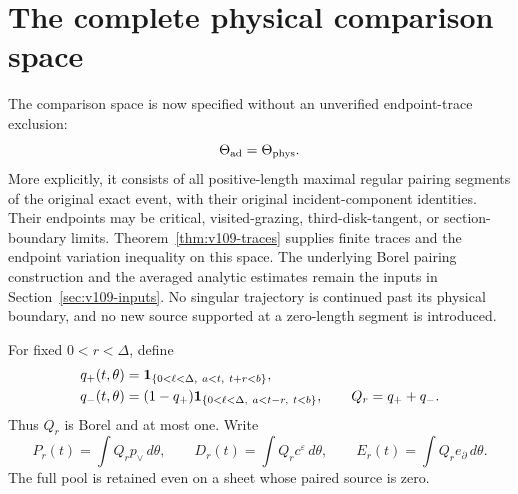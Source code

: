 \section{The complete physical comparison space}
\label{sec:v109-pool}
The comparison space is now specified without an unverified
endpoint-trace exclusion:
\begin{equation}\label{eq:v109-admissible}
 \Theta_{\rm ad}=\Theta_{\rm phys}.
\end{equation}
More explicitly, it consists of all positive-length maximal regular
pairing segments of the original exact event, with their original
incident-component identities. Their endpoints may be critical,
visited-grazing, third-disk-tangent, or section-boundary limits.
Theorem~\ref{thm:v109-traces} supplies finite traces and the endpoint
variation inequality on this space. The underlying Borel pairing
construction and the averaged analytic estimates remain the inputs
in Section~\ref{sec:v109-inputs}. No singular trajectory is continued
past its physical boundary, and no new source supported at a
zero-length segment is introduced.

For fixed $0<r<\Delta$, define
\begin{align}
 q_+(t,\theta)&=\one_{\{0<\ell<\Delta,\ a<t,\ t+r<b\}},\notag\\
 q_-(t,\theta)&=(1-q_+)\one_{\{0<\ell<\Delta,\ a<t-r,\ t<b\}},
 \qquad Q_r=q_++q_-.
 \label{eq:v109-pool}
\end{align}
Thus $Q_r$ is Borel and at most one. Write
\[
 P_r(t)=\int Q_r p_\vee\,d\theta,
 \qquad D_r(t)=\int Q_r c^\varepsilon\,d\theta,
 \qquad E_r(t)=\int Q_r e_\partial\,d\theta.
\]
The full pool is retained even on a sheet whose paired source is zero.

